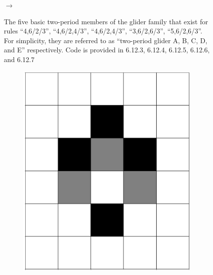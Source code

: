 \documentclass[12pt]{article}
\numberwithin{figure}{section} %
\begin{document}
\begin{figure}[H]
\begin{subfigure}{0.3\textwidth}
     \subcaption{}
   \end{subfigure}
      {\LARGE$\xrightarrow{}$}
   \setcounter{subfigure}{0}
   \caption{The five basic two-period members of the glider family that exist for rules “4,6/2/3”, “4,6/2,4/3”, “4,6/2,4/3”, “3,6/2,6/3”, “5,6/2,6/3”. For simplicity, they are referred to as “two-period glider A, B, C, D, and E” respectively. Code is provided in 6.12.3, 6.12.4, 6.12.5, 6.12.6, and 6.12.7}
   \vspace{-1.5em}
\end{figure}

\begin{figure}[H]
 \begin{subfigure}{0.18\textwidth}
     \centering
     \includegraphics[angle=270,width=\linewidth]{Section4/8.0}
     \subcaption{}
   \end{subfigure}
     \begin{subfigure}{0.18\textwidth}
     \centering

\end{subfigure}
\end{figure}
\end{document}
